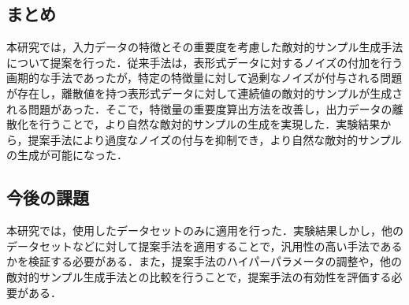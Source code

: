\subsection{まとめ}
本研究では，入力データの特徴とその重要度を考慮した敵対的サンプル生成手法について提案を行った．従来手法は，表形式データに対するノイズの付加を行う画期的な手法であったが，特定の特徴量に対して過剰なノイズが付与される問題が存在し，離散値を持つ表形式データに対して連続値の敵対的サンプルが生成される問題があった．そこで，特徴量の重要度算出方法を改善し，出力データの離散化を行うことで，より自然な敵対的サンプルの生成を実現した．実験結果から，提案手法により過度なノイズの付与を抑制でき，より自然な敵対的サンプルの生成が可能になった．
\subsection{今後の課題}
本研究では，使用したデータセットのみに適用を行った．実験結果しかし，他のデータセットなどに対して提案手法を適用することで，汎用性の高い手法であるかを検証する必要がある．また，提案手法のハイパーパラメータの調整や，他の敵対的サンプル生成手法との比較を行うことで，提案手法の有効性を評価する必要がある．
